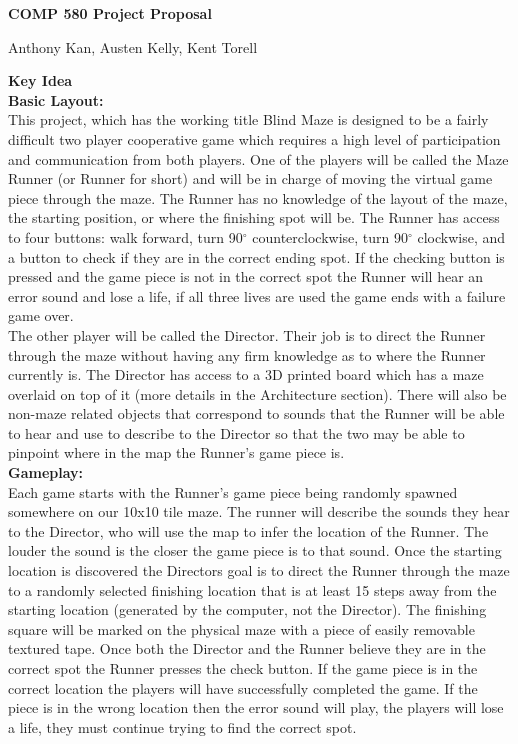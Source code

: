\documentclass[12pt]{article}
\begin{document}
\centerline{\large \textbf{COMP 580 Project Proposal}}
\centerline{Anthony Kan, Austen Kelly, Kent Torell}
\vskip 0.5cm

\textbf{\large Key Idea}\\
\textbf{Basic Layout:}\\
\indent This project, which has the working title Blind Maze is designed to be a fairly difficult two player cooperative game which requires a high level of participation and communication from both players.  One of the players will be called the Maze Runner (or Runner for short) and will be in charge of moving the virtual game piece through the maze.  The Runner has no knowledge of the layout of the maze, the starting position, or where the finishing spot will be. The Runner has access to four buttons: walk forward, turn 90$^\circ$ counterclockwise, turn 90$^\circ$ clockwise, and a button to check if they are in the correct ending spot.  If the checking button is pressed and the game piece is not in the correct spot the Runner will hear an error sound and lose a life, if all three lives are used the game ends with a failure game over.\\
\indent The other player will be called the Director. Their job is to direct the Runner through the maze without having any firm knowledge as to where the Runner currently is. The Director has access to a 3D printed board which has a maze overlaid on top of it (more details in the Architecture section).  There will also be non-maze related objects that correspond to sounds that the Runner will be able to hear and use to describe to the Director so that the two may be able to pinpoint where in the map the Runner's game piece is.\\
\textbf{Gameplay:}\\
\indent Each game starts with the Runner's game piece being randomly spawned somewhere on our 10x10 tile maze.  The runner will describe the sounds they hear to the Director, who will use the map to infer the location of the Runner.  The louder the sound is the closer the game piece is to that sound.  Once the starting location is discovered the Directors goal is to direct the Runner through the maze to a randomly selected finishing location that is at least 15 steps away from the starting location (generated by the computer, not the Director). The finishing square will be marked on the physical maze with a piece of easily removable textured tape. Once both the Director and the Runner believe they are in the correct spot the Runner presses the check button.  If the game piece is in the correct location the players will have successfully completed the game.  If the piece is in the wrong location then the error sound will play, the players will lose a life, they must continue trying to find the correct spot.\\
\end{document}
